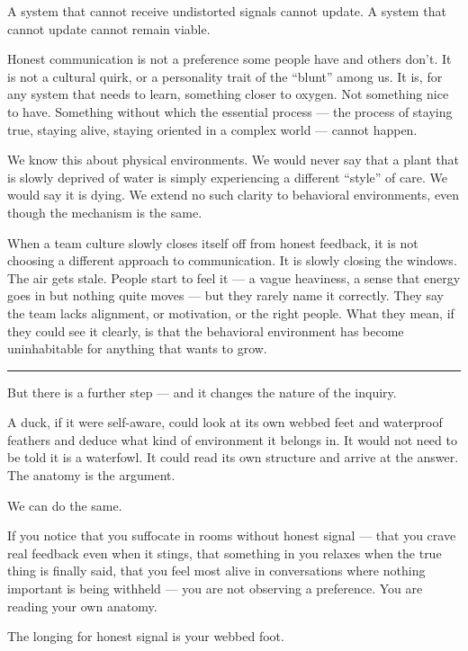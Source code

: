 \documentclass[12pt,letterpaper]{article}
\begin{document}
A system that cannot receive undistorted signals cannot update. A system that cannot update cannot remain viable.

Honest communication is not a preference some people have and others don't. It is not a cultural quirk, or a personality trait of the ``blunt'' among us. It is, for any system that needs to learn, something closer to oxygen. Not something nice to have. Something without which the essential process — the process of staying true, staying alive, staying oriented in a complex world — cannot happen.

We know this about physical environments. We would never say that a plant that is slowly deprived of water is simply experiencing a different ``style'' of care. We would say it is dying. We extend no such clarity to behavioral environments, even though the mechanism is the same.

When a team culture slowly closes itself off from honest feedback, it is not choosing a different approach to communication. It is slowly closing the windows. The air gets stale. People start to feel it — a vague heaviness, a sense that energy goes in but nothing quite moves — but they rarely name it correctly. They say the team lacks alignment, or motivation, or the right people. What they mean, if they could see it clearly, is that the behavioral environment has become uninhabitable for anything that wants to grow.

\begin{center}
\rule{\textwidth}{0.4pt}
\end{center}

But there is a further step — and it changes the nature of the inquiry.

A duck, if it were self-aware, could look at its own webbed feet and waterproof feathers and deduce what kind of environment it belongs in. It would not need to be told it is a waterfowl. It could read its own structure and arrive at the answer. The anatomy is the argument.

We can do the same.

If you notice that you suffocate in rooms without honest signal — that you crave real feedback even when it stings, that something in you relaxes when the true thing is finally said, that you feel most alive in conversations where nothing important is being withheld — you are not observing a preference. You are reading your own anatomy.

The longing for honest signal is your webbed foot.
\end{document}
